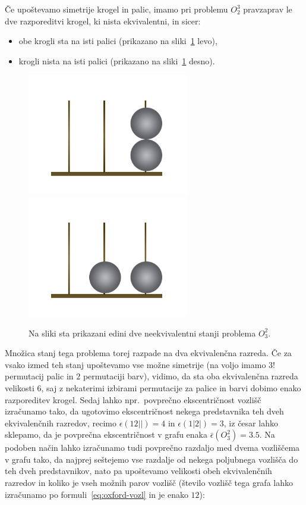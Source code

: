 \documentclass[12pt,a4paper]{amsart}
\theoremstyle{definition} %
\theoremstyle{plain} %
\begin{document}
Če upoštevamo simetrije krogel in palic, imamo pri problemu $O_2^3$ pravzaprav le dve razporeditvi krogel, ki nista ekvivalentni, in sicer: 
\begin{itemize}
    \item obe krogli sta na isti palici (prikazano na sliki~\ref{fig:neekviv-oxf-stanji} levo),
    \item krogli nista na isti palici (prikazano na sliki~\ref{fig:neekviv-oxf-stanji} desno).
\end{itemize}

\begin{figure}[h]
    \includegraphics[width=200pt]{img/oxford-tower-O^2_3-towerlike.png}
    \includegraphics[width=200pt]{img/oxford-tower-O^2_3-flat.png}
    \caption{Na sliki sta prikazani edini dve neekvivalentni stanji problema $O^2_3$. }
    \label{fig:neekviv-oxf-stanji}
\end{figure}

Množica stanj tega problema torej razpade na dva ekvivalenčna razreda. Če za vsako izmed teh stanj upoštevamo vse možne simetrije (na voljo imamo $3!$ permutacij palic in $2$ permutaciji barv), vidimo, da sta oba ekvivalenčna razreda velikosti $6$, saj z nekaterimi izbirami permutacije za palice in barvi dobimo enako razporeditev krogel. Sedaj lahko npr.\ povprečno ekscentričnost vozlišč izračunamo tako, da ugotovimo ekscentričnost nekega predstavnika teh dveh ekvivalenčnih razredov, recimo $\epsilon(12||) = 4$ in $\epsilon(1|2|) = 3$, iz česar lahko sklepamo, da je povprečna ekscentričnost v grafu enaka $\bar{\epsilon}(O^2_3) = 3.5$. Na podoben način lahko izračunamo tudi povprečno razdaljo med dvema vozliščema v grafu tako, da najprej seštejemo vse razdalje od nekega poljubnega vozlišča do teh dveh predstavnikov, nato pa upoštevamo velikosti obeh ekvivalenčnih razredov in koliko je vseh možnih parov vozlišč (število vozlišč tega grafa lahko izračunamo po formuli~\eqref{eq:oxford-vozl} in je enako $12$):
\end{document}
